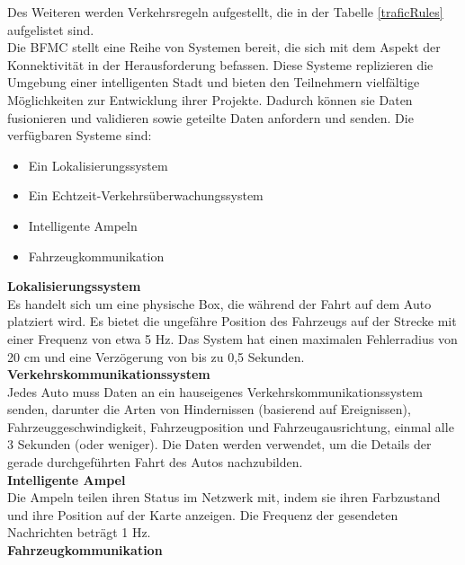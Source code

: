 Des Weiteren werden Verkehrsregeln aufgestellt, die in der Tabelle \ref{traficRules} aufgelistet sind.\\

Die \gls{BFMC} stellt eine Reihe von Systemen bereit, die sich mit dem Aspekt der Konnektivität in der Herausforderung befassen. Diese Systeme replizieren die Umgebung einer intelligenten Stadt und bieten den Teilnehmern vielfältige Möglichkeiten zur Entwicklung ihrer Projekte. Dadurch können sie Daten fusionieren und validieren sowie geteilte Daten anfordern und senden. Die verfügbaren Systeme sind:

\begin{itemize}
    \item Ein Lokalisierungssystem
    \item Ein Echtzeit-Verkehrsüberwachungssystem
    \item Intelligente Ampeln
    \item Fahrzeugkommunikation
\end{itemize}

\textbf{Lokalisierungssystem}\\

Es handelt sich um eine physische Box, die während der Fahrt auf dem Auto platziert wird. Es bietet die ungefähre Position des Fahrzeugs auf der Strecke mit einer Frequenz von etwa 5 Hz. Das System hat einen maximalen Fehlerradius von 20 cm und eine Verzögerung von bis zu 0,5 Sekunden.\cite{bfmc-vehicle2everyth}\\
\newpage
\textbf{Verkehrskommunikationssystem}\\

Jedes Auto muss Daten an ein hauseigenes Verkehrskommunikationssystem senden, darunter die Arten von Hindernissen (basierend auf Ereignissen), Fahrzeuggeschwindigkeit, Fahrzeugposition und Fahrzeugausrichtung, einmal alle 3 Sekunden (oder weniger). Die Daten werden verwendet, um die Details der gerade durchgeführten Fahrt des Autos nachzubilden.\cite{bfmc-vehicle2everyth}\\

\textbf{Intelligente Ampel}\\

Die Ampeln teilen ihren Status im Netzwerk mit, indem sie ihren Farbzustand und ihre Position auf der Karte anzeigen. Die Frequenz der gesendeten Nachrichten beträgt 1 Hz.\cite{bfmc-vehicle2everyth}\\

\textbf{Fahrzeugkommunikation}\\

